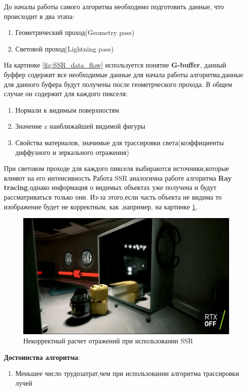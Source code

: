 \documentclass[a4paper,14pt, unknownkeysallowed]{extreport}
\begin{document}
До началы работы самого алгоритма необходимо подготовить данные, что происходит в два этапа:
\begin{enumerate}
	\item Геометрический проход(Geometry pass)
	\item Световой проход(Lightning pass)
\end{enumerate}

На картинке \ref{fig:SSR_data_flow} используется понятие \textbf{G-buffer}, данный буффер содержит все необходимые данные для начала работы алгоритма,данные для данного буфера
будут получены после геометрческого прохода. В общем случае он содержит для каждого пикселя:
\begin{enumerate}
	\item Нормали к видимым поверхностям
	\item Значение z наиближайшей видимой фигуры
	\item Свойства материалов, значимые для трассировки света(коэффициенты диффузного и зеркального отражения)
\end{enumerate}
При световом проходе для каждого пикселя выбираются источники,которые влияют на его интенсивность
Работа SSR аналогична работе алгоритма \textbf{Ray tracing},однако информация о видимых объектах уже получена и будут рассматриваться только они.
Из-за этого,если часть объекта не видима то изображение будет не корректным, как ,например, на картинке \ref{fig:SSR_fail}.\cite{SSR,reflexion_types}
\begin{figure}[H]
	\centering
	\includegraphics[scale=0.4]{SSR_fail.jpg}
	\caption{Некорректный расчет отражений при использовании SSR}
	\label{fig:SSR_fail}
\end{figure} 

\textbf{Достоинства алгоритма}:
\begin{enumerate}
	\item Меньшее число трудозатрат,чем при использовании алгоритма трассировки лучей
\end{enumerate}
\end{document}
